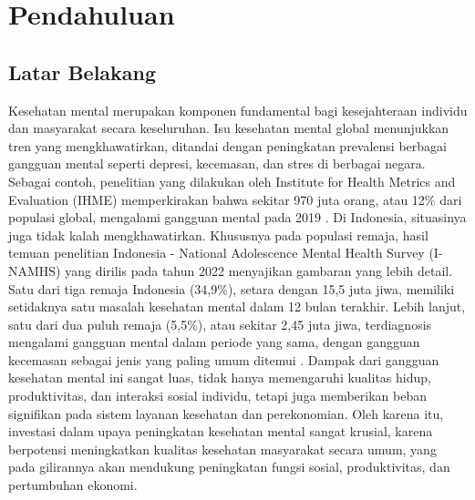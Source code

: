 \chapter{Pendahuluan}

\section{Latar Belakang}
Kesehatan mental merupakan komponen fundamental bagi kesejahteraan individu dan masyarakat secara keseluruhan.
Isu kesehatan mental global menunjukkan tren yang mengkhawatirkan, ditandai dengan peningkatan prevalensi berbagai gangguan mental seperti depresi, kecemasan, dan stres di berbagai negara.
Sebagai contoh, penelitian yang dilakukan oleh Institute for Health Metrics and Evaluation (IHME) memperkirakan bahwa sekitar 970 juta orang, atau 12\% dari populasi global, mengalami gangguan mental pada 2019 \cite{GBD2019MentalDisorders}.
Di Indonesia, situasinya juga tidak kalah mengkhawatirkan. Khususnya pada populasi remaja, hasil temuan penelitian Indonesia - National Adolescence Mental Health Survey (I-NAMHS) yang dirilis pada tahun 2022 menyajikan gambaran yang lebih detail.
Satu dari tiga remaja Indonesia (34,9\%), setara dengan 15,5 juta jiwa, memiliki setidaknya satu masalah kesehatan mental dalam 12 bulan terakhir.
Lebih lanjut, satu dari dua puluh remaja (5,5\%), atau sekitar 2,45 juta jiwa, terdiagnosis mengalami gangguan mental dalam periode yang sama, dengan gangguan kecemasan sebagai jenis yang paling umum ditemui \cite{INAMHS2022}.
Dampak dari gangguan kesehatan mental ini sangat luas, tidak hanya memengaruhi kualitas hidup, produktivitas, dan interaksi sosial individu, tetapi juga memberikan beban signifikan pada sistem layanan kesehatan dan perekonomian.
Oleh karena itu, investasi dalam upaya peningkatan kesehatan mental sangat krusial, karena berpotensi meningkatkan kualitas kesehatan masyarakat secara umum, yang pada gilirannya akan mendukung peningkatan fungsi sosial, produktivitas, dan pertumbuhan ekonomi.


